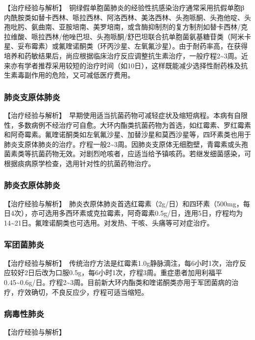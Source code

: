 【治疗经验与解析】　铜绿假单胞菌肺炎的经验性抗感染治疗通常采用抗假单胞β内酰胺类如替卡西林、哌拉西林、阿洛西林、美洛西林、头孢哌酮、头孢他啶、头孢吡肟、氨曲南、亚胺培南、美罗培南，或含酶抑制剂的复方制剂如替卡西林/克拉维酸、哌拉西林/他唑巴坦、头孢哌酮/舒巴坦联合抗单胞菌氨基糖苷类（阿米卡星、妥布霉素）或氟喹诺酮类（环丙沙星、左氧氟沙星）。由于耐药率高，在获得培养和药敏结果后，尚应根据临床治疗反应调整抗生素治疗，一般疗程2\textasciitilde{}3周。近来亦有学者推荐采用较短的治疗时间（如10日），这样既能减少选择性耐药株及抗生素毒副作用的危险，又可减低医疗费用。

\subsubsection{肺炎支原体肺炎}

【治疗经验与解析】　早期使用适当抗菌药物可减轻症状及缩短病程。本病有自限性，多数病例不经治疗可自愈。大环内酯类抗菌药物为首选，如红霉素、罗红霉素和阿奇霉素。氟喹诺酮类如左氧氟沙星、加替沙星和莫西沙星等，四环素类也用于肺炎支原体肺炎的治疗。疗程一般2\textasciitilde{}3周。因肺炎支原体无细胞壁，青霉素或头孢菌素类等抗菌药物无效。对剧烈呛咳者，应适当给予镇咳药。若继发细菌感染，可根据痰病原学检查，选用针对性的抗菌药物治疗。

\subsubsection{肺炎衣原体肺炎}

【治疗经验与解析】　肺炎衣原体肺炎首选红霉素（2g/日）和四环素（500mg，每日4次），亦可选用多西环素或克拉霉素，阿奇霉素0.5g/日，连用5日，疗程均为14\textasciitilde{}21日。氟喹诺酮类也可选用。对发热、干咳、头痛等可对症治疗。

\subsubsection{军团菌肺炎}

【治疗经验与解析】　传统治疗方法是红霉素1.0g静脉滴注，每6小时1次，治疗反应较好2日后改为口服0.5g，每6小时1次，疗程3周。重症患者加用利福平0.45\textasciitilde{}0.6g/日。疗程2\textasciitilde{}3周。目前新大环内酯类和喹诺酮类亦用于军团菌病的治疗，疗效确切，不良反应少，疗程可适当缩短。

\subsubsection{病毒性肺炎}

【治疗经验与解析】

